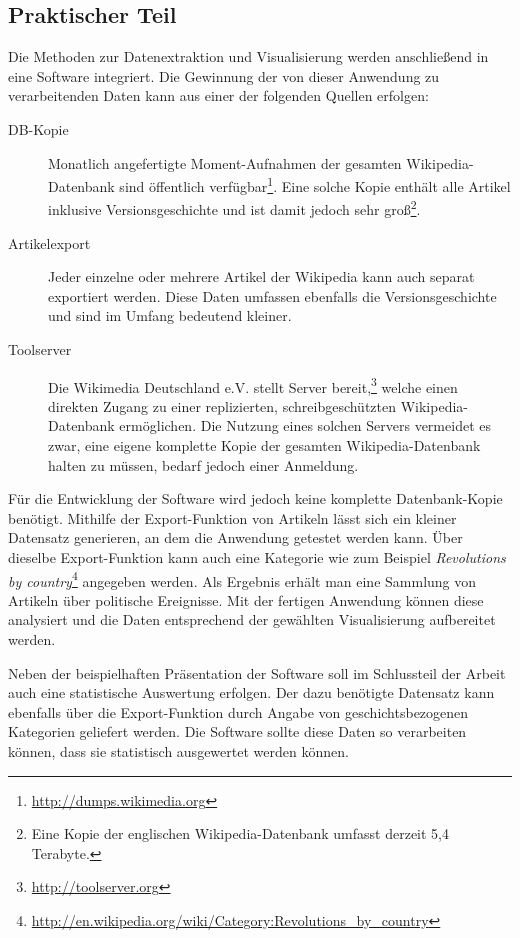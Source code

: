\subsection{Praktischer Teil}

Die Methoden zur Datenextraktion und Visualisierung werden anschließend in eine Software integriert.
Die Gewinnung der von dieser Anwendung zu verarbeitenden Daten kann aus einer der folgenden Quellen erfolgen:

\begin{description}
\item[DB-Kopie] Monatlich angefertigte Moment-Aufnahmen der gesamten Wikipedia-Datenbank sind öffentlich verfügbar\footnote{\url{http://dumps.wikimedia.org}}. Eine solche Kopie enthält alle Artikel inklusive Versionsgeschichte und ist damit jedoch sehr groß\footnote{Eine Kopie der englischen Wikipedia-Datenbank umfasst derzeit 5,4 Terabyte.}.
\item[Artikelexport] Jeder einzelne oder mehrere Artikel der Wikipedia kann auch separat exportiert werden. Diese Daten umfassen ebenfalls die Versionsgeschichte und sind im Umfang bedeutend kleiner.
\item[Toolserver] Die Wikimedia Deutschland e.V. stellt Server bereit,\footnote{\url{http://toolserver.org}} welche einen direkten Zugang zu einer replizierten, schreibgeschützten Wikipedia-Datenbank ermöglichen. Die Nutzung eines solchen Servers vermeidet es zwar, eine eigene komplette Kopie der gesamten Wikipedia-Datenbank halten zu müssen, bedarf jedoch einer Anmeldung.
\end{description}

Für die Entwicklung der Software wird jedoch keine komplette Datenbank-Kopie benötigt. 
Mithilfe der Export-Funktion von Artikeln lässt sich ein kleiner Datensatz generieren, an dem die Anwendung getestet werden kann.
Über dieselbe Export-Funktion kann auch eine Kategorie wie zum Beispiel \emph{Revolutions by country}\footnote{\url{http://en.wikipedia.org/wiki/Category:Revolutions_by_country}} angegeben werden. 
Als Ergebnis erhält man eine Sammlung von Artikeln über politische Ereignisse.
Mit der fertigen Anwendung können diese analysiert und die Daten entsprechend der gewählten Visualisierung aufbereitet werden.

Neben der beispielhaften Präsentation der Software soll im Schlussteil der Arbeit auch eine statistische Auswertung erfolgen.
Der dazu benötigte Datensatz kann ebenfalls über die Export-Funktion durch Angabe von geschichtsbezogenen Kategorien geliefert werden.
Die Software sollte diese Daten so verarbeiten können, dass sie statistisch ausgewertet werden können. 

